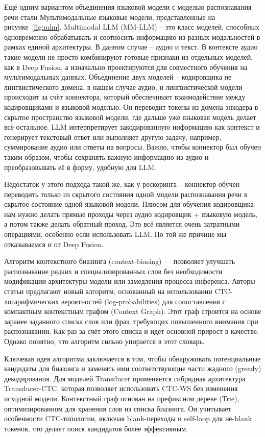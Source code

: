 Ещё одним вариантом объединения языковой модели с моделью распознавания речи стали Мультимодальные языковые модели, представленные на рисунке~\ref{fig:mlm}.
Multimodal LLM (MM-LLM)\cite{grattafiori2024llama, chu2023qwen, tang2023salmonn, radhakrishnan2023whispering} -- это класс моделей, способных одновременно обрабатывать и соотносить информацию из разных модальностей в рамках единой архитектуры.
В данном случае -- аудио и текст.
В контексте аудио такие модели не просто комбинируют готовые признаки из отдельных моделей, как в Deep Fusion, а изначально проектируются для совместного обучения на мультимодальных данных.
Объединение двух моделей -- кодировщика не лингвистического домена, в нашем случае аудио, и лингвистической модели -- происходит за счёт коннектора, который обеспечивает взаимодействие между кодировщиками и языковой моделью\cite{li2022blip,radford2021learning,chu2023qwen}.
Он переводит токены из домена энкодера в скрытое пространство языковой модели, где дальше уже языковая модель делает всё остальное.
LLM интерпретирует закодированную информацию как контекст и генерирует текстовый ответ или выполняет другую задачу, например, суммирование аудио или ответы на вопросы.
Важно, чтобы коннектор был обучен таким образом, чтобы сохранять важную информацию из аудио и преобразовывать её в форму, удобную для LLM.

Недостаток у этого подхода такой же, как у рескоринга -- коннектор обучен переводить только из скрытого состояния одной модели распознавания речи в скрытое состояние одной языковой модели.
Плюсом для обучения кодировщика нам нужно делать прямые проходы через аудио кодировщик + языковую модель, а потом также делать обратный проход.
Это всё является очень затратными операциями, особенно если использовать LLM.
По той же причине мы отказываемся и от Deep Fusion.

Алгоритм контекстного биазинга (context-biasing)\cite{andrusenko2024fast} --  позволяет улучшать распознавание редких и специализированных слов без необходимости модификации архитектуры модели или замедления процесса инференса.
Авторы статьи предлагают новый алгоритм, основанный на использовании CTC-логарифмических вероятностей (log-probabilities) для сопоставления с компактным контекстным графом (Context Graph).
Этот граф строится на основе заранее заданного списка слов или фраз, требующих повышенного внимания при распознавании.
Как раз за счёт этого списка и идёт основной прирост в качестве.
Однако понятно, что алгоритм сильно упирается в этот словарь.

Ключевая идея алгоритма заключается в том, чтобы обнаруживать потенциальные кандидаты для биазинга и заменять ими соответствующие части жадного (greedy) декодирования.
Для моделей Transducer применяется гибридная архитектура Transducer-CTC, которая позволяет использовать CTC-WS без изменения исходной модели.
Контекстный граф основан на префиксном дереве (Trie), оптимизированном для хранения слов из списка биазинга.
Он учитывает особенности CTC-топологии, включая blank-переходы и self-loop для не-blank токенов, что делает поиск кандидатов более эффективным.

